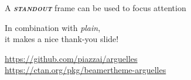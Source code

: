 \documentclass[aspectratio=169,compress,12pt]{beamer}
\begin{document}
\begin{frame}[standout]
      \centering\large
      A \textbf{\itshape\scshape standout} frame can be used to focus attention
\end{frame}

\End
\begin{frame}
      \centering
      In combination with \textit{plain}, \\
      it makes a nice thank-you slide!
      \vfill
      \scalebox{4}{\faGithub} \par\bigskip
      \url{https://github.com/piazzai/arguelles} \\
      \url{https://ctan.org/pkg/beamertheme-arguelles}
\end{frame}
\end{document}
